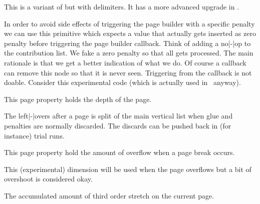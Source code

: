 \stopnewprimitive

\startoldprimitive[title={\prm {overwithdelims}}][obsolete=yes]

This is a variant of  but with delimiters. It has a more advanced
upgrade in .

\stopoldprimitive

\startnewprimitive[title={\prm {pageboundary}}]

In order to avoid side effects of triggering the page builder with a specific
penalty we can use this primitive which expects a value that actually gets
inserted as zero penalty before triggering the page builder callback. Think of
adding a no|-|op to the contribution list. We fake a zero penalty so that all
gets processed. The main rationale is that we get a better indication of what we
do. Of course a callback can remove this node so that it is never seen.
Triggering from the callback is not doable. Consider this experimental code
(which is actually used in \CONTEXT\ anyway).

\stopnewprimitive

\startnewprimitive[title={\prm {pagedepth}}]

This page property holds the depth of the page.

\stopnewprimitive

\startoldprimitive[title={\prm {pagediscards}}]

The left|-|overs after a page is split of the main vertical list when glue and
penalties are normally discarded. The discards can be pushed back in (for
instance) trial runs.

\stopoldprimitive

\startnewprimitive[title={\prm {pageexcess}}]

This page property hold the amount of overflow when a page break occurs.

\stopnewprimitive

\startnewprimitive[title={\prm {pageextragoal}}]

This (experimental) dimension will be used when the page overflows but a bit of
overshoot is considered okay.

\stopnewprimitive

\startoldprimitive[title={\prm {pagefilllstretch}}]

The accumulated amount of third order stretch on the current page.

\stopoldprimitive

\startoldprimitive[title={\prm {pagefillstretch}}]

